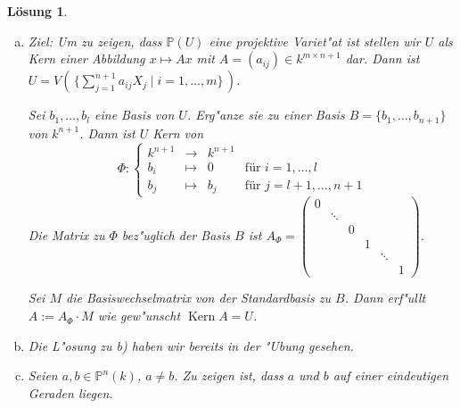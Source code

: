 \documentclass[a4paper, 12pt, numbers=noendperiod, chapterprefix=true, headsepline]{scrbook}
\theoremstyle{break}
\newtheorem{Loes}{L\"osung}
\theoremstyle{nonumberbreak}
\theoremstyle{nonumberplain}
\DeclareMathOperator{\Kern}{Kern}
\newcommand{\IP}{\mathbb{P}}%
\begin{document}
\begin{Loes}\begin{enumerate}[a)]
\item
	Ziel: Um zu zeigen, dass $\IP(U)$ eine projektive Variet"at ist stellen wir $U$ als Kern einer Abbildung $x \mapsto Ax$ mit $A = (a_{ij}) \in k^{m \times n+1}$ dar. Dann ist $U = V( \,\{ \sum_{j=1}^{n+1} a_{ij} X_j \mid i = 1, \dots, m \}\,)$.
	
	Sei $b_1, \dots, b_l$ eine Basis von $U$. Erg"anze sie zu einer Basis $B = \{ b_1, \dots, b_{n+1} \}$ von $k^{n+1}$. Dann ist $U$ Kern von
		\[\Phi: \left \{ \begin{array}{rcll}
			k^{n+1}& \to & k^{n+1}\\
			b_i &\mapsto& 0 &\textrm{für } i = 1, \dots, l\\
			b_j &\mapsto& b_j &\textrm{für } j = l+1, \dots, n+1
		\end{array} \right.\]
	Die Matrix zu $\Phi$ bez"uglich der Basis $B$ ist 
		$A_\Phi= \left( \begin{smallmatrix}
                                                           0 \\ 
                                                           & \ddots \\
                                                           & & 0 \\
                                                           & & & 1 \\ 
                                                           &&&& \ddots \\
                                                           &&&&& 1 
                                                          \end{smallmatrix}
		\right)$.

	Sei $M$ die Basiswechselmatrix von der Standardbasis zu $B$. Dann erf"ullt $A := A_\Phi \cdot M$ wie gew"unscht $\Kern A = U$.

\item
	Die L"osung zu b) haben wir bereits in der "Ubung gesehen.
\item
	Seien $a,b \in \IP^n(k)$, $a \neq b$. Zu zeigen ist, dass $a$ und $b$ auf einer eindeutigen Geraden liegen.
	

\end{enumerate}
\end{Loes}
\end{document}
